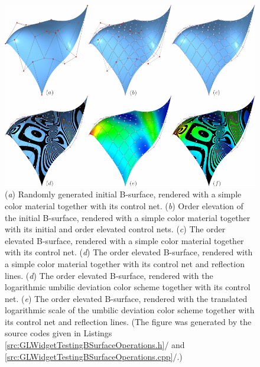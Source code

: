 \documentclass[b5paper, twosided]{book}
\DeclareRobustCommand{\mref}[1]{\ref{#1}{\relsize{-1}/\pageref{#1}}}
\begin{document}
\newpage{}



\begin{figure}[!htb]
    \centering
    \includegraphics[]{images/B_surface_order_elevation.pdf}
    \caption{(\textit{a}) Randomly generated initial B-surface, rendered with a simple color material together with its control net. (\textit{b}) Order elevation of the initial B-surface, rendered with a simple color material together with its initial and order elevated control nets. (\textit{c}) The order elevated B-surface, rendered with a simple color material together with its control net. (\textit{d}) The order elevated B-surface, rendered with a simple color material together with its control net and reflection lines. (\textit{d}) The order elevated B-surface, rendered with the logarithmic umbilic deviation color scheme together with its control net. (\textit{e}) The order elevated B-surface, rendered with the translated logarithmic scale of the umbilic deviation color scheme together with its control net and reflection lines. (The figure was generated by the source codes given in Listings \mref{src:GLWidgetTestingBSurfaceOperations.h} and \mref{src:GLWidgetTestingBSurfaceOperations.cpp}.)}
    \label{fig:B_surface_order_elevation}
\end{figure}
\end{document}
